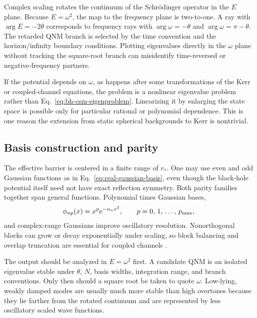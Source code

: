 Complex scaling rotates the continuum of the Schr\"odinger operator in the
$E$ plane.  Because $E=\omega^2$, the map to the frequency plane is
two-to-one.  A ray with $\arg E=-2\theta$ corresponds to frequency rays with
$\arg\omega=-\theta$ and $\arg\omega=\pi-\theta$.  The retarded QNM branch is
selected by the time convention and the horizon/infinity boundary conditions.
Plotting eigenvalues directly in the $\omega$ plane without tracking the
square-root branch can misidentify time-reversed or negative-frequency
partners.

If the potential depends on $\omega$, as happens after some transformations
of the Kerr or coupled-channel equations, the problem is a nonlinear
eigenvalue problem rather than Eq.~\eqref{eq:bh-csm-eigenproblem}.  Linearizing
it by enlarging the state space is possible only for particular rational or
polynomial dependence.  This is one reason the extension from static
spherical backgrounds to Kerr is nontrivial.

\subsection{Basis construction and parity}
\label{subsec:bh-basis}

The effective barrier is centered in a finite range of $r_*$.  One may use
even and odd Gaussian functions as in Eq.~\eqref{eq:real-gaussian-basis}, even
though the black-hole potential itself need not have exact reflection
symmetry.  Both parity families together span general functions.  Polynomial
times Gaussian bases,
\begin{equation}
  \phi_{np}(x)=x^p\mathrm{e}^{-\alpha_nx^2},
  \qquad \text{$p=0$, $1$, \dots, $p_{\max}$} ,
  \label{eq:polynomial-gaussian}
\end{equation}
and complex-range Gaussians improve oscillatory resolution.  Nonorthogonal
blocks can grow or decay exponentially under scaling, so block balancing and
overlap truncation are essential for coupled channels
\cite{Ogawa:2026veu,Ogawa:2026dSCSM}.

The output should be analyzed in $E=\omega^2$ first.  A candidate QNM is an
isolated eigenvalue stable under $\theta$, $N$, basis widths, integration
range, and branch conventions.  Only then should a square root be taken to
quote $\omega$.  Low-lying, weakly damped modes are usually much more stable
than high overtones because they lie farther from the rotated continuum and
are represented by less oscillatory scaled wave functions.

